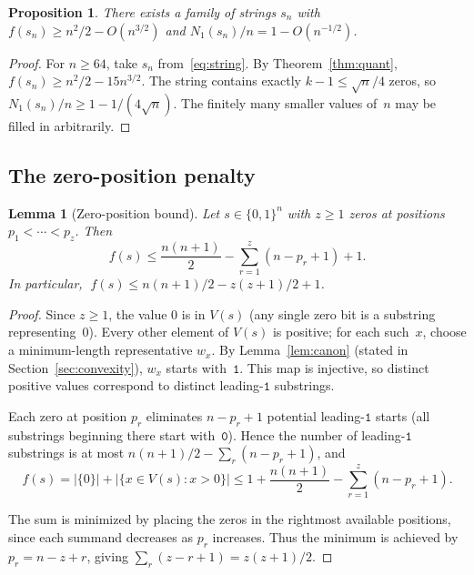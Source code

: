 \documentclass[11pt,a4paper]{article}
\theoremstyle{plain}
\newtheorem{lemma}[theorem]{Lemma}
\newtheorem{proposition}[theorem]{Proposition}
\theoremstyle{definition}
\theoremstyle{remark}
\newcommand{\ones}{N_1}
\begin{document}
\begin{proposition}\label{prop:near-opt-density}
  There exists a family of strings $s_n$ with
  $f(s_n) \ge n^2/2 - O(n^{3/2})$ and
  $\ones(s_n)/n = 1 - O(n^{-1/2})$.
\end{proposition}

\begin{proof}
  For $n \ge 64$, take $s_n$ from~\eqref{eq:string}.  By Theorem~\ref{thm:quant},
  $f(s_n) \ge n^2/2 - 15n^{3/2}$.  The string contains exactly
  $k - 1 \le \sqrt{n}/4$ zeros, so
  $\ones(s_n)/n \ge 1 - 1/(4\sqrt{n})$.
  The finitely many smaller values of~$n$ may be filled in arbitrarily.
\end{proof}

\subsection{The zero-position penalty}

\begin{lemma}[Zero-position bound]\label{lem:zero-pos}
  Let $s \in \{0,1\}^n$ with $z \ge 1$ zeros at positions
  $p_1 < \cdots < p_z$.  Then
  \[
    f(s) \le \frac{n(n{+}1)}{2} - \sum_{r=1}^z (n - p_r + 1) + 1.
  \]
  In particular, $\;f(s) \le n(n{+}1)/2 - z(z{+}1)/2 + 1$.
\end{lemma}

\begin{proof}
  Since $z \ge 1$, the value $0$ is in $V(s)$ (any single zero bit
  is a substring representing~$0$).  Every other element of $V(s)$ is
  positive; for each such~$x$, choose a minimum-length representative
  $w_x$.  By Lemma~\ref{lem:canon} (stated in
  Section~\ref{sec:convexity}), $w_x$ starts with~$\mathtt{1}$.
  This map is injective, so distinct positive values correspond to
  distinct leading-$\mathtt{1}$ substrings.

  Each zero at position $p_r$ eliminates $n - p_r + 1$ potential
  leading-$\mathtt{1}$ starts (all substrings beginning there start
  with~$\mathtt{0}$).  Hence the number of
  leading-$\mathtt{1}$ substrings is at most
  $n(n{+}1)/2 - \sum_r(n - p_r + 1)$, and
  \[
    f(s) = |\{0\}| + |\{x \in V(s) : x > 0\}|
    \le 1 + \frac{n(n{+}1)}{2} - \sum_{r=1}^z(n - p_r + 1).
  \]

  The sum is minimized by placing the zeros in the rightmost available
  positions, since each summand decreases as $p_r$ increases.  Thus
  the minimum is achieved by $p_r = n - z + r$, giving
  $\sum_r(z - r + 1) = z(z{+}1)/2$.
\end{proof}
\end{document}
